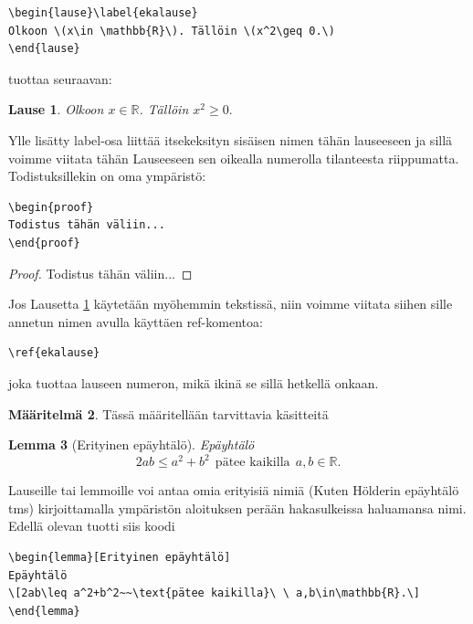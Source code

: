 \documentclass[a4paper,12 pt]{article}
\theoremstyle{plain}
\newtheorem{lause}{Lause}[section]
\newtheorem{lemma}[lause]{Lemma}
\theoremstyle{definition}
\newtheorem{maaritelma}[lause]{M\"a\"aritelm\"a}
\theoremstyle{remark}
\numberwithin{equation}{section}
\numberwithin{figure}{section}
\begin{document}
\begin{verbatim}
\begin{lause}\label{ekalause} 
Olkoon \(x\in \mathbb{R}\). Tällöin \(x^2\geq 0.\)
\end{lause}
\end{verbatim}

tuottaa seuraavan:

\begin{lause}\label{ekalause} 
Olkoon \(x\in \mathbb{R}\). Tällöin \(x^2\geq 0.\)
\end{lause}

\noindent Ylle lisätty label-osa liittää itsekeksityn sisäisen nimen tähän lauseeseen ja sillä voimme viitata tähän Lauseeseen sen oikealla numerolla tilanteesta riippumatta. Todistuksillekin on oma ympäristö:

\begin{verbatim}
\begin{proof}
Todistus tähän väliin...
\end{proof}
\end{verbatim}

\begin{proof}
Todistus tähän väliin...
\end{proof}
Jos Lausetta \ref{ekalause} käytetään myöhemmin tekstissä, niin voimme viitata siihen sille annetun nimen avulla käyttäen ref-komentoa:

\begin{verbatim}
\ref{ekalause}
\end{verbatim}
joka tuottaa lauseen numeron, mikä ikinä se sillä hetkellä onkaan.

\begin{maaritelma}
Tässä määritellään tarvittavia käsitteitä
\end{maaritelma}

\begin{lemma}[Erityinen epäyhtälö]
Epäyhtälö
\[2ab\leq a^2+b^2~~\text{pätee kaikilla}\ \ a,b\in\mathbb{R}.\]
\end{lemma}
Lauseille tai lemmoille voi antaa omia erityisiä nimiä (Kuten Hölderin epäyhtälö tms) kirjoittamalla ympäristön aloituksen perään hakasulkeissa haluamansa nimi. Edellä olevan tuotti siis koodi

\begin{verbatim}
\begin{lemma}[Erityinen epäyhtälö]
Epäyhtälö
\[2ab\leq a^2+b^2~~\text{pätee kaikilla}\ \ a,b\in\mathbb{R}.\]
\end{lemma}
\end{verbatim}
\end{document}
